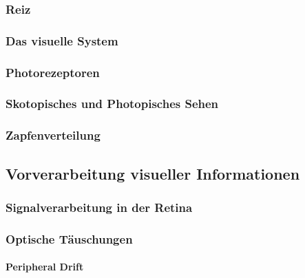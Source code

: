 \documentclass[a4paper, 11pt, accentcolor = tud3b]{tudreport}
\begin{document}
				\subsubsection{Reiz} %

				\subsubsection{Das visuelle System} %

				\subsubsection{Photorezeptoren} %

				\subsubsection{Skotopisches und Photopisches Sehen} %

				\subsubsection{Zapfenverteilung} %

			\subsection{Vorverarbeitung visueller Informationen} %

				\subsubsection{Signalverarbeitung in der Retina} %

				\subsubsection{Optische Täuschungen} %

					\paragraph{Peripheral Drift} %
\end{document}
